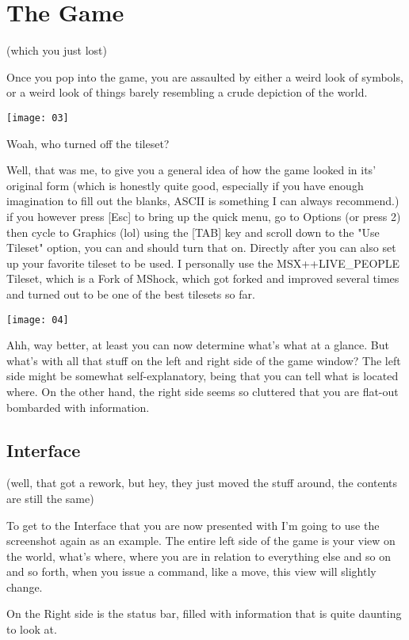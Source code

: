\chapter{The Game}
(which you just lost)

Once you pop into the game, you are assaulted by either a weird look of symbols, or a weird look of things barely resembling a crude depiction of the world.

\texttt{[image: 03]}

Woah, who turned off the tileset?

Well, that was me, to give you a general idea of how the game looked in its' original form (which is honestly quite good, especially if you have enough imagination to fill out the blanks, ASCII is something I can always recommend.) if you however press [Esc] to bring up the quick menu, go to Options (or press 2) then cycle to Graphics (lol) using the [TAB] key and scroll down to the "Use Tileset" option, you can and should turn that on. Directly after you can also set up your favorite tileset to be used. I personally use the MSX++LIVE\_PEOPLE Tileset, which is a Fork of MShock, which got forked and improved several times and turned out to be one of the best tilesets so far.

\texttt{[image: 04]}

Ahh, way better, at least you can now determine what's what at a glance. But what's with all that stuff on the left and right side of the game window? The left side might be somewhat self-explanatory, being that you can tell what is located where. On the other hand, the right side seems so cluttered that you are flat-out bombarded with information.

\section{Interface}

(well, that got a rework, but hey, they just moved the stuff around, the contents are still the same)

To get to the Interface that you are now presented with I'm going to use the screenshot again as an example.
The entire left side of the game is your view on the world, what's where, where you are in relation to everything else and so on and so forth, when you issue a command, like a move, this view will slightly change.

On the Right side is the status bar, filled with information that is quite daunting to look at.

